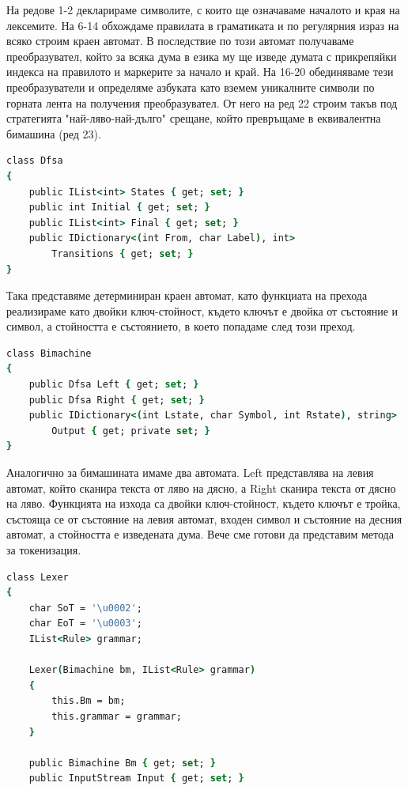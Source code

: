 \documentclass[12pt, oneside]{article}
\theoremstyle{definition}
\begin{document}
На редове 1-2 декларираме символите, с които ще означаваме началото и края на лексемите. На 6-14 обхождаме правилата в граматиката и по регулярния израз на всяко строим краен автомат. В последствие по този автомат получаваме преобразувател, който за всяка дума в езика му ще изведе думата с прикрепяйки индекса на правилото и маркерите за начало и край. На 16-20 обединяваме тези преобразуватели и определяме азбуката като вземем уникалните символи по горната лента на получения преобразувател. От него на ред 22 строим такъв под стратегията "най-ляво-най-дълго" срещане, който превръщаме в еквивалентна бимашина (ред 23). 

\begin{lstlisting}[language=csh]
class Dfsa
{
    public IList<int> States { get; set; }
    public int Initial { get; set; }
    public IList<int> Final { get; set; }
    public IDictionary<(int From, char Label), int> 
        Transitions { get; set; }
}
\end{lstlisting}

Така представяме детерминиран краен автомат, като функциата на прехода реализираме като двойки ключ-стойност, където ключът е двойка от състояние и символ, а стойността е състоянието, в което попадаме след този преход.

\begin{lstlisting}[language=csh]
class Bimachine
{
    public Dfsa Left { get; set; }
    public Dfsa Right { get; set; }
    public IDictionary<(int Lstate, char Symbol, int Rstate), string> 
        Output { get; private set; }
}
\end{lstlisting}

Аналогично за бимашината имаме два автомата. Left представлява на левия автомат, който сканира текста от ляво на дясно, а Right сканира текста от дясно на ляво. Функцията на изхода са двойки ключ-стойност, където ключът е тройка, състояща се от състояние на левия автомат, входен символ и състояние на десния автомат, а стойността е изведената дума. Вече сме готови да представим метода за токенизация.

\begin{lstlisting}[language=csh]
class Lexer
{
    char SoT = '\u0002';
    char EoT = '\u0003';
    IList<Rule> grammar;

    Lexer(Bimachine bm, IList<Rule> grammar)
    {
        this.Bm = bm;
        this.grammar = grammar;
    }

    public Bimachine Bm { get; set; }
    public InputStream Input { get; set; }
\end{lstlisting}
\end{document}
